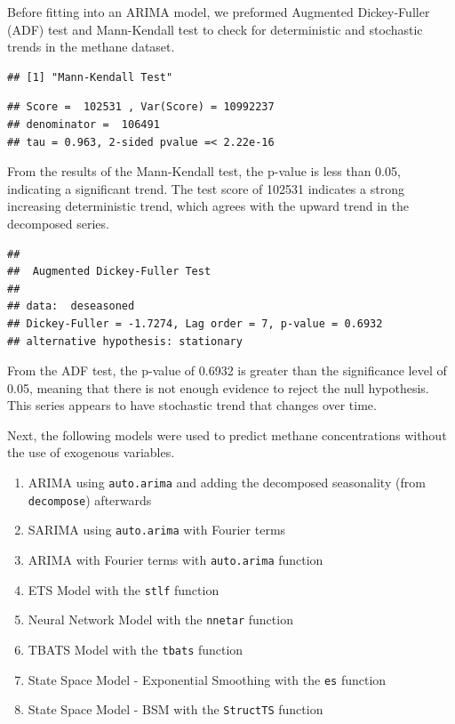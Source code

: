 \documentclass[
]{article}
\providecommand{\tightlist}{%
  \setlength{\itemsep}{0pt}\setlength{\parskip}{0pt}}
\begin{document}
Before fitting into an ARIMA model, we preformed Augmented Dickey-Fuller
(ADF) test and Mann-Kendall test to check for deterministic and
stochastic trends in the methane dataset.

\begin{verbatim}
## [1] "Mann-Kendall Test"
\end{verbatim}

\begin{verbatim}
## Score =  102531 , Var(Score) = 10992237
## denominator =  106491
## tau = 0.963, 2-sided pvalue =< 2.22e-16
\end{verbatim}

From the results of the Mann-Kendall test, the p-value is less than
0.05, indicating a significant trend. The test score of 102531 indicates
a strong increasing deterministic trend, which agrees with the upward
trend in the decomposed series.

\begin{verbatim}
## 
##  Augmented Dickey-Fuller Test
## 
## data:  deseasoned
## Dickey-Fuller = -1.7274, Lag order = 7, p-value = 0.6932
## alternative hypothesis: stationary
\end{verbatim}

From the ADF test, the p-value of 0.6932 is greater than the
significance level of 0.05, meaning that there is not enough evidence to
reject the null hypothesis. This series appears to have stochastic trend
that changes over time.

Next, the following models were used to predict methane concentrations
without the use of exogenous variables.

\begin{enumerate}
\def\labelenumi{\arabic{enumi}.}
\tightlist
\item
  ARIMA using \texttt{auto.arima} and adding the decomposed seasonality
  (from \texttt{decompose}) afterwards
\item
  SARIMA using \texttt{auto.arima} with Fourier terms
\item
  ARIMA with Fourier terms with \texttt{auto.arima} function
\item
  ETS Model with the \texttt{stlf} function
\item
  Neural Network Model with the \texttt{nnetar} function
\item
  TBATS Model with the \texttt{tbats} function
\item
  State Space Model - Exponential Smoothing with the \texttt{es}
  function
\item
  State Space Model - BSM with the \texttt{StructTS} function
\end{enumerate}
\end{document}
